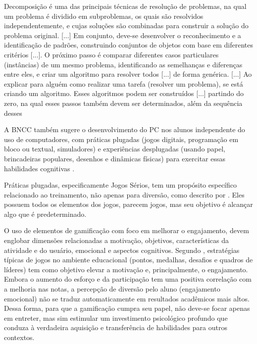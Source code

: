 \documentclass{abnt}
\begin{document}
\begin{citacao}
    Decomposição é uma das principais técnicas de resolução de problemas, na
    qual um problema é dividido em subproblemas, os quais são resolvidos
    independentemente, e cujas soluções são combinadas para construir a solução
    do problema original. [...] Em conjunto, deve-se desenvolver o
    reconhecimento e a identificação de padrões, construindo conjuntos de
    objetos com base em diferentes critérios [...]. O próximo passo é comparar
    diferentes casos particulares (instâncias) de um mesmo problema,
    identificando as semelhanças e diferenças entre eles, e criar um algoritmo
    para resolver todos [...] de forma genérica. [...] Ao explicar para alguém
    como realizar uma tarefa (resolver um problema), se está criando um
    algoritmo. Esses algoritmos podem ser construídos [...] partindo do zero, na
    qual esses passos também devem ser determinados, além da sequência desses
    \cite{brasil2017}
\end{citacao}
A BNCC também sugere o desenvolvimento do PC nos alunos independente do uso de
computadores, com práticas plugadas (jogos digitais, programação em bloco ou
textual, simuladores) e experiências desplugadas (usando papel, brincadeiras
populares, desenhos e dinâmicas físicas) para exercitar essas habilidades
cognitivas \cite{brasil2017}.

Práticas plugadas, especificamente Jogos Sérios, tem um propósito específico
relacionado ao treinamento, não apenas para diversão, como descrito por
\cite{kiryakova2014gamification}. Eles possuem todos os elementos dos jogos,
parecem jogos, mas seu objetivo é alcançar algo que é predeterminado.

O uso de elementos de gamificação com foco em melhorar o engajamento, devem
englobar dimensões relacionadas a motivação, objetivos, características da
atividade e do usuário, emocional e aspectos cognitivos. Segundo
\cite{silpasuwanchai2016developing}, estratégias típicas de jogos no ambiente
educacional (pontos, medalhas, desafios e quadros de líderes) tem como objetivo
elevar a motivação e, principalmente, o engajamento. Embora o aumento do esforço
e da participação tem uma positiva correlação com a melhoria nas notas, a
percepção de diversão pelo aluno (engajamento emocional) não se traduz
automaticamente em resultados acadêmicos mais altos. Dessa forma, para que a
gamificação cumpra seu papel, não deve-se focar apenas em entreter, mas sim
estimular um investimento psicológico profundo que conduza à verdadeira
aquisição e transferência de habilidades para outros contextos.
\end{document}
